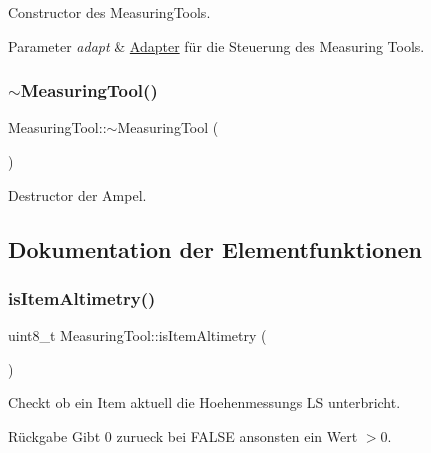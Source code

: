 Constructor des Measuring\+Tools.


\begin{DoxyParams}{Parameter}
{\em adapt} & \hyperlink{class_adapter}{Adapter} für die Steuerung des Measuring Tools. \\
\hline
\end{DoxyParams}
\hypertarget{class_measuring_tool_a35667285cd41bda48fcc747194c862cd}{}\label{class_measuring_tool_a35667285cd41bda48fcc747194c862cd} 
\subsubsection{\texorpdfstring{$\sim$\+Measuring\+Tool()}{~MeasuringTool()}}
{\footnotesize\ttfamily Measuring\+Tool\+::$\sim$\+Measuring\+Tool (\begin{DoxyParamCaption}{ }\end{DoxyParamCaption})\hspace{0.3cm}{\ttfamily [virtual]}}

Destructor der Ampel. 

\subsection{Dokumentation der Elementfunktionen}
\hypertarget{class_measuring_tool_aebbb332d935cadef3c072ca7102896d3}{}\label{class_measuring_tool_aebbb332d935cadef3c072ca7102896d3} 
\subsubsection{\texorpdfstring{is\+Item\+Altimetry()}{isItemAltimetry()}}
{\footnotesize\ttfamily uint8\+\_\+t Measuring\+Tool\+::is\+Item\+Altimetry (\begin{DoxyParamCaption}{ }\end{DoxyParamCaption})}

Checkt ob ein Item aktuell die Hoehenmessungs LS unterbricht.

\begin{DoxyReturn}{Rückgabe}
Gibt 0 zurueck bei F\+A\+L\+SE ansonsten ein Wert $>$0. 
\end{DoxyReturn}
\hypertarget{class_measuring_tool_a431263df5654d0dc1587ef23e97c1392}{}\label{class_measuring_tool_a431263df5654d0dc1587ef23e97c1392} 
